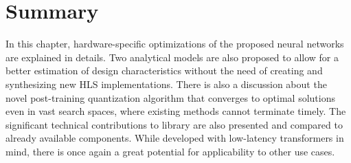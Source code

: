 \section{Summary}
In this chapter, hardware-specific optimizations of the proposed neural networks are explained in details. Two analytical models are also proposed to allow for a better estimation of design characteristics without the need of creating and synthesizing new HLS implementations. There is also a discussion about the novel post-training quantization algorithm that converges to optimal solutions even in vast search spaces, where existing methods cannot terminate timely. The significant technical contributions to \hlsml library are also presented and compared to already available components. While developed with low-latency transformers in mind, there is once again a great potential for applicability to other use cases.